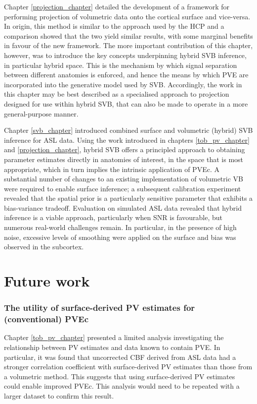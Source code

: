 \documentclass[12pt]{report}
\begin{document}
Chapter \ref{projection_chapter} detailed the development of a framework for performing projection of volumetric data onto the cortical surface and vice-versa. In origin, this method is similar to the approach used by the HCP and a comparison showed that the two yield similar results, with some marginal benefits in favour of the new framework. The more important contribution of this chapter, however, was to introduce the key concepts underpinning hybrid SVB inference, in particular hybrid space. This is the mechanism by which signal separation between different anatomies is enforced, and hence the means by which PVE are incorporated into the generative model used by SVB. Accordingly, the work in this chapter may be best described as a specialised approach to projection designed for use within hybrid SVB, that can also be made to operate in a more general-purpose manner. 

Chapter \ref{svb_chapter} introduced combined surface and volumetric (hybrid) SVB inference for ASL data. Using the work introduced in chapters \ref{tob_pv_chapter} and \ref{projection_chapter}, hybrid SVB offers a principled approach to obtaining parameter estimates directly in anatomies of interest, in the space that is most appropriate, which in turn implies the intrinsic application of PVEc. A substantial number of changes to an existing implementation of volumetric VB were required to enable surface inference; a subsequent calibration experiment revealed that the spatial prior is a particularly sensitive parameter that exhibits a bias-variance tradeoff. Evaluation on simulated ASL data revealed that hybrid inference is a viable approach, particularly when SNR is favourable, but numerous real-world challenges remain. In particular, in the presence of high noise, excessive levels of smoothing were applied on the surface and bias was observed in the subcortex. 


\section{Future work}

\subsubsection{The utility of surface-derived PV estimates for (conventional) PVEc}

Chapter \ref{tob_pv_chapter} presented a limited analysis investigating the relationship between PV estimates and data known to contain PVE. In particular, it was found that uncorrected CBF derived from ASL data had a stronger correlation coefficient with surface-derived PV estimates than those from a volumetric method. This suggests that using surface-derived PV estimates could enable improved PVEc. This analysis would need to be repeated with a larger dataset to confirm this result. 
\end{document}
